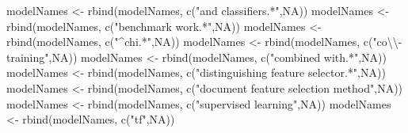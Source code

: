 \documentclass[
]{article}
\newenvironment{Shaded}{\begin{snugshade}}{\end{snugshade}}
\newcommand{\ConstantTok}[1]{\textcolor[rgb]{0.00,0.00,0.00}{#1}}
\newcommand{\FunctionTok}[1]{\textcolor[rgb]{0.00,0.00,0.00}{#1}}
\newcommand{\NormalTok}[1]{#1}
\newcommand{\OtherTok}[1]{\textcolor[rgb]{0.56,0.35,0.01}{#1}}
\newcommand{\SpecialCharTok}[1]{\textcolor[rgb]{0.00,0.00,0.00}{#1}}
\newcommand{\StringTok}[1]{\textcolor[rgb]{0.31,0.60,0.02}{#1}}
\begin{document}
\begin{Shaded}
\begin{Highlighting}[]
\NormalTok{modelNames }\OtherTok{\textless{}{-}} \FunctionTok{rbind}\NormalTok{(modelNames, }\FunctionTok{c}\NormalTok{(}\StringTok{"and classifiers.*"}\NormalTok{,}\ConstantTok{NA}\NormalTok{))}
\NormalTok{modelNames }\OtherTok{\textless{}{-}} \FunctionTok{rbind}\NormalTok{(modelNames, }\FunctionTok{c}\NormalTok{(}\StringTok{"benchmark work.*"}\NormalTok{,}\ConstantTok{NA}\NormalTok{))}
\NormalTok{modelNames }\OtherTok{\textless{}{-}} \FunctionTok{rbind}\NormalTok{(modelNames, }\FunctionTok{c}\NormalTok{(}\StringTok{"\^{}chi.*"}\NormalTok{,}\ConstantTok{NA}\NormalTok{))}
\NormalTok{modelNames }\OtherTok{\textless{}{-}} \FunctionTok{rbind}\NormalTok{(modelNames, }\FunctionTok{c}\NormalTok{(}\StringTok{"co}\SpecialCharTok{\textbackslash{}\textbackslash{}}\StringTok{{-}training"}\NormalTok{,}\ConstantTok{NA}\NormalTok{))}
\NormalTok{modelNames }\OtherTok{\textless{}{-}} \FunctionTok{rbind}\NormalTok{(modelNames, }\FunctionTok{c}\NormalTok{(}\StringTok{"combined with.*"}\NormalTok{,}\ConstantTok{NA}\NormalTok{))}
\NormalTok{modelNames }\OtherTok{\textless{}{-}} \FunctionTok{rbind}\NormalTok{(modelNames, }\FunctionTok{c}\NormalTok{(}\StringTok{"distinguishing feature selector.*"}\NormalTok{,}\ConstantTok{NA}\NormalTok{)) }
\NormalTok{modelNames }\OtherTok{\textless{}{-}} \FunctionTok{rbind}\NormalTok{(modelNames, }\FunctionTok{c}\NormalTok{(}\StringTok{"document feature selection method"}\NormalTok{,}\ConstantTok{NA}\NormalTok{))}
\NormalTok{modelNames }\OtherTok{\textless{}{-}} \FunctionTok{rbind}\NormalTok{(modelNames, }\FunctionTok{c}\NormalTok{(}\StringTok{"supervised learning"}\NormalTok{,}\ConstantTok{NA}\NormalTok{))}
\NormalTok{modelNames }\OtherTok{\textless{}{-}} \FunctionTok{rbind}\NormalTok{(modelNames, }\FunctionTok{c}\NormalTok{(}\StringTok{"tf"}\NormalTok{,}\ConstantTok{NA}\NormalTok{))}


\end{Highlighting}
\end{Shaded}
\end{document}
